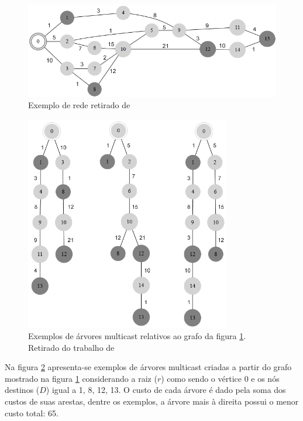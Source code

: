 \begin{figure}
	\label{fig_prm_grafo}
	\caption{Exemplo de rede retirado de \cite{Bueno2010}}
	\centering
	\includegraphics[width=1\textwidth]{cap_problemas/figs/prm_grafo}
\end{figure}

\begin{figure}
	\label{fig_prm_mono}
	\caption{Exemplos de árvores multicast relativos ao grafo da figura \ref{fig_prm_grafo}. Retirado do trabalho de \cite{Lafeta2016}}
	\centering
	\includegraphics[width=0.8\textwidth]{cap_problemas/figs/prm_mono}
\end{figure}

Na figura \ref{fig_prm_mono} apresenta-se exemplos de árvores multicast criadas a partir do grafo mostrado na figura \ref{fig_prm_grafo} considerando a raiz ($r$) como sendo o vértice 0 e os nós destinos ($D$) igual a {1, 8, 12, 13}. O custo de cada árvore é dado pela soma dos custos de suas arestas, dentre os exemplos, a árvore mais à direita possui o menor custo total: 65.


